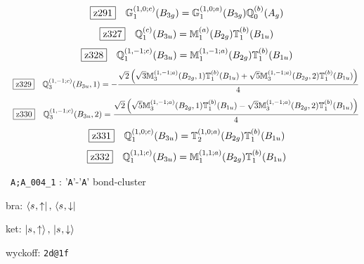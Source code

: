 \documentclass[fleqn,10pt,landscape]{jsarticle}
\begin{document}
\begin{dmath*}
\hspace*{3mm}\fbox{z291}\quad \mathbb{G}_{1}^{(1,0;c)}(B_{3g})=\mathbb{G}_{1}^{(1,0;a)}(B_{3g}) \mathbb{Q}_{0}^{(b)}(A_{g})
\end{dmath*}
\begin{dmath*}
\hspace*{3mm}\fbox{z327}\quad \mathbb{Q}_{1}^{(c)}(B_{3u})=\mathbb{M}_{1}^{(a)}(B_{2g}) \mathbb{T}_{1}^{(b)}(B_{1u})
\end{dmath*}
\begin{dmath*}
\hspace*{3mm}\fbox{z328}\quad \mathbb{Q}_{1}^{(1,-1;c)}(B_{3u})=\mathbb{M}_{1}^{(1,-1;a)}(B_{2g}) \mathbb{T}_{1}^{(b)}(B_{1u})
\end{dmath*}
\begin{dmath*}
\hspace*{3mm}\fbox{z329}\quad \mathbb{Q}_{3}^{(1,-1;c)}(B_{3u},1)=- \frac{\sqrt{2} \left(\sqrt{3} \mathbb{M}_{3}^{(1,-1;a)}(B_{2g},1) \mathbb{T}_{1}^{(b)}(B_{1u}) + \sqrt{5} \mathbb{M}_{3}^{(1,-1;a)}(B_{2g},2) \mathbb{T}_{1}^{(b)}(B_{1u})\right)}{4}
\end{dmath*}
\begin{dmath*}
\hspace*{3mm}\fbox{z330}\quad \mathbb{Q}_{3}^{(1,-1;c)}(B_{3u},2)=\frac{\sqrt{2} \left(\sqrt{5} \mathbb{M}_{3}^{(1,-1;a)}(B_{2g},1) \mathbb{T}_{1}^{(b)}(B_{1u}) - \sqrt{3} \mathbb{M}_{3}^{(1,-1;a)}(B_{2g},2) \mathbb{T}_{1}^{(b)}(B_{1u})\right)}{4}
\end{dmath*}
\begin{dmath*}
\hspace*{3mm}\fbox{z331}\quad \mathbb{Q}_{1}^{(1,0;c)}(B_{3u})=\mathbb{T}_{2}^{(1,0;a)}(B_{2g}) \mathbb{T}_{1}^{(b)}(B_{1u})
\end{dmath*}
\begin{dmath*}
\hspace*{3mm}\fbox{z332}\quad \mathbb{Q}_{1}^{(1,1;c)}(B_{3u})=\mathbb{M}_{1}^{(1,1;a)}(B_{2g}) \mathbb{T}_{1}^{(b)}(B_{1u})
\end{dmath*}
\vspace{5mm}

\noindent\textbullet\, \texttt{A;A_004_1} : '\texttt{A}'-'\texttt{A}' bond-cluster

\noindent\quad * bra: $\bra{s_{},\uparrow},\, \bra{s_{},\downarrow}$

\noindent\quad * ket: $\ket{s_{},\uparrow},\, \ket{s_{},\downarrow}$

\noindent\quad * wyckoff: \texttt{2d@1f}
\end{document}
